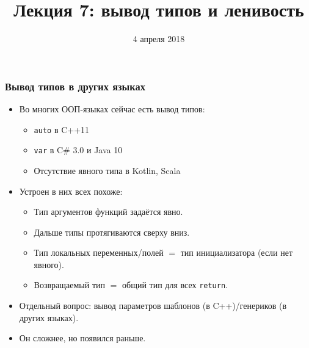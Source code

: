 \documentclass[11pt]{beamer}
\title{Лекция 7: вывод типов и ленивость}
\date{4 апреля 2018}
\begin{document}
\begin{frame}[plain]
\maketitle
\end{frame}

\begin{frame}[fragile]
\frametitle{Вывод типов в других языках}
\begin{itemize}
    \item Во многих ООП-языках сейчас есть вывод типов:
    \hspace{-1em}
    \pause
    \begin{itemize}
        \item \lstinline!auto! в C++11
        \item \lstinline!var! в C\# 3.0 и Java 10
        \item Отсутствие явного типа в Kotlin, Scala
    \end{itemize}
    \pause
    \item Устроен в них всех похоже:
    \begin{itemize}
        \pause
        \item Тип аргументов функций задаётся явно.
        \pause
        \item Дальше типы протягиваются сверху вниз.
        \pause
        \item Тип локальных переменных/полей $=$ тип инициализатора (если нет явного).
        \pause
        \item Возвращаемый тип $=$ общий тип для всех \lstinline!return!.
    \end{itemize}
    \pause
    \item Отдельный вопрос: вывод параметров шаблонов (в C++)/генериков (в других языках).
    \pause
    \item Он сложнее, но появился раньше.
\end{itemize}
\end{frame}
\end{document}
